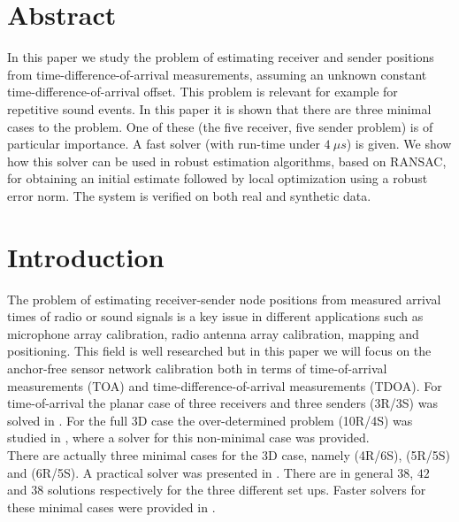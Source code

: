 \documentclass[
]{book}
\begin{document}
\hypertarget{sfsabstract}{%
\section*{Abstract}\label{sfsabstract}}

In this paper we study the problem of estimating receiver and sender positions from time-difference-of-arrival measurements, assuming an unknown constant time-difference-of-arrival offset. This problem is relevant for example for repetitive sound events. In this paper it is shown that there are three minimal cases to the problem. One of these (the five receiver, five sender problem) is of particular importance. A fast solver (with run-time under \(4~ \mu s\)) is given. We show how this solver can be used in robust estimation algorithms, based on RANSAC, for obtaining an initial estimate followed by local optimization using a robust error norm. The system is verified on both real and synthetic data.

\newpage

\hypertarget{introduction}{%
\section{Introduction}\label{introduction}}

The problem of estimating receiver-sender node positions from measured arrival times of radio or sound signals is a key issue in different applications such as microphone array calibration, radio antenna array calibration, mapping and positioning. This field is well researched but in this paper we will focus on the anchor-free sensor network calibration both in terms of time-of-arrival measurements (TOA) and time-difference-of-arrival measurements (TDOA).
For time-of-arrival the planar case of three receivers and three senders (3R/3S) was solved in \cite{stewenius-phd-2005}.
For the full 3D case the over-determined problem (10R/4S) was studied in \cite{pollefeys-nister-icassp-08}, where a solver for this non-minimal case was provided.\\
There are actually three minimal cases for the 3D case, namely (4R/6S), (5R/5S) and (6R/5S). A practical solver was presented in
\cite{kuang-burgess-etal-icassp-13}. There are in general \(38\), \(42\) and \(38\) solutions respectively for the three different set ups.
Faster solvers for these minimal cases were provided in \cite{larsson2017polynomial}.
\end{document}
